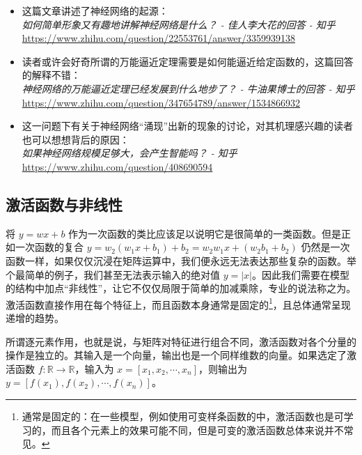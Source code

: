 \begin{tcolorbox}[myrecommendbox, title=推荐阅读, breakable=false]
    \begin{itemize}
        \item 这篇文章讲述了神经网络的起源：\\
              \textit{如何简单形象又有趣地讲解神经网络是什么？ - 佳人李大花的回答 - 知乎}\\
              \url{https://www.zhihu.com/question/22553761/answer/3359939138}
        \item 读者或许会好奇所谓的万能逼近定理需要是如何能逼近给定函数的，这篇回答的解释不错：\\
              \textit{神经网络的万能逼近定理已经发展到什么地步了？ - 牛油果博士的回答 - 知乎}\\
              \url{https://www.zhihu.com/question/347654789/answer/1534866932}
        \item 这一问题下有关于神经网络“涌现”出新的现象的讨论，对其机理感兴趣的读者也可以想想背后的原因：\\
              \textit{如果神经网络规模足够大，会产生智能吗？ - 知乎}\\
              \url{https://www.zhihu.com/question/408690594}
    \end{itemize}
\end{tcolorbox}

\newpage

\subsection{激活函数与非线性}

将 $y=wx+b$ 作为一次函数的类比应该足以说明它是很简单的一类函数。但是正如一次函数的复合 $ y = w_2(w_1x+b_1)+b_2 = w_2w_1x + (w_2b_1+b_2) $
仍然是一次函数一样，如果仅仅沉浸在矩阵运算中，我们便永远无法表达那些复杂的函数。举个最简单的例子，我们甚至无法表示输入的绝对值 $y=|x|$。因此我们需要在模型的结构中加点“非线性”，让它不仅仅局限于简单的加减乘除，专业的说法称之为。激活函数直接作用在每个特征上，而且函数本身通常是固定的\footnote{通常是固定的：在一些模型，例如使用可变样条函数的中，激活函数也是可学习的，而且各个元素上的效果可能不同，但是可变的激活函数总体来说并不常见。}，且总体通常呈现递增的趋势。

所谓逐元素作用，也就是说，与矩阵对特征进行组合不同，激活函数对各个分量的操作是独立的。其输入是一个向量，输出也是一个同样维数的向量。如果选定了激活函数 $f:\mathbb{R}\to\mathbb{R}$，输入为 $x = [x_1, x_2, \cdots, x_n]$，则输出为 $y = [f(x_1), f(x_2), \cdots, f(x_n)]$。

